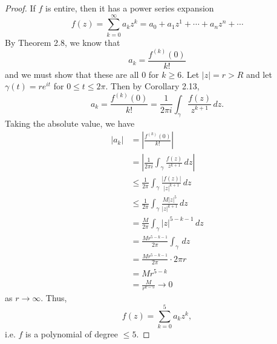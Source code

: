 \documentclass[11pt,oneside,english]{amsart}
\theoremstyle{definition}
\begin{document}
\begin{enumerate}[leftmargin=*]
\begin{proof}
If $f$ is entire, then it has a power series expansion
\[
f(z)=\sum_{k=0}^\infty a_kz^k=a_0+a_1z^1+\cdots+a_nz^n+\cdots
\]
By Theorem 2.8, we know that
\[
a_k=\frac{f^{(k)}(0)}{k!}
\]
and we must show that these are all 0 for $k\geq 6$. Let $|z|=r>R$ and let $\gamma(t)=re^{it}$ for $0\leq t\leq 2\pi$. Then by Corollary 2.13, 
\[
a_k=\frac{f^{(k)}(0)}{k!}=\frac{1}{2\pi i}\int_\gamma\frac{f(z)}{z^{k+1}}\,dz.
\]
Taking the absolute value, we have
\begin{align*}
|a_k|&=\left|\frac{f^{(k)}(0)}{k!}\right|\\[2mm]
&=\left|\frac{1}{2\pi i}\int_\gamma\frac{f(z)}{z^{k+1}}\,dz\right|\\[2mm]
&\leq\frac{1}{2\pi}\int_\gamma\frac{|f(z)|}{|z|^{k+1}}\,dz\\[2mm]
&\leq\frac{1}{2\pi}\int_\gamma\frac{M|z|^5}{|z|^{k+1}}\,dz\\[2mm]
&=\frac{M}{2\pi}\int_\gamma |z|^{5-k-1}\,dz\\[2mm]
&=\frac{Mr^{5-k-1}}{2\pi}\int_\gamma \,dz\\[2mm]
&=\frac{Mr^{5-k-1}}{2\pi}\cdot2\pi r\\[2mm]
&=Mr^{5-k}\\[2mm]
&=\frac{M}{r^{k-5}}\to0
\end{align*}
as $r\to\infty$. Thus,
\[
f(z)=\sum_{k=0}^5a_kz^k,
\]
i.e. $f$ is a polynomial of degree $\leq 5$.
\end{proof}

\end{enumerate}
\end{document}

